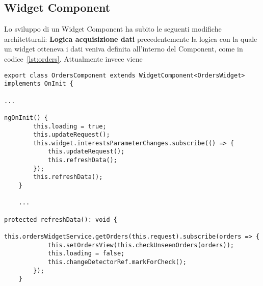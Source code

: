 \subsection{Widget Component}
Lo sviluppo di un Widget Component ha subito le seguenti modifiche architetturali:
\textbf{Logica acquisizione dati} precedentemente la logica con la quale un widget otteneva i dati veniva definita all'interno del Component, come in codice~\ref{lst:orders}. Attualmente invece viene 

\begin{lstlisting}[caption={Utilizzo metodo refreshData, orders.component.ts},label={lst:orders},style=javascriptCode]
export class OrdersComponent extends WidgetComponent<OrdersWidget> implements OnInit {

...

ngOnInit() {
        this.loading = true;
        this.updateRequest();
        this.widget.interestsParameterChanges.subscribe(() => {
            this.updateRequest();
            this.refreshData();
        });
        this.refreshData();
    }
    
    ...
    
protected refreshData(): void {
        this.ordersWidgetService.getOrders(this.request).subscribe(orders => {
            this.setOrdersView(this.checkUnseenOrders(orders));
            this.loading = false;
            this.changeDetectorRef.markForCheck();
        });
    }
\end{lstlisting}